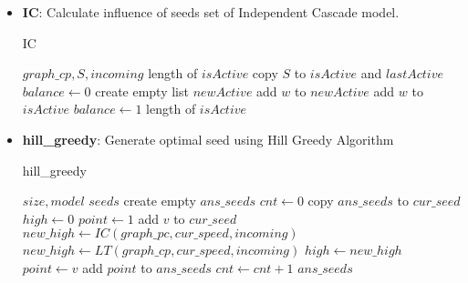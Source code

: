 \documentclass[conference,compsoc]{IEEEtran}
\renewcommand{\algorithmicrequire}{\textbf{Input:}}
\renewcommand{\algorithmicensure}{\textbf{Output:}}
\begin{document}
\begin{itemize}
  \item \textbf{IC}: Calculate influence of seeds set of Independent
	 Cascade model.
    \begin{algorithm}[H]
     \caption{IC}
     \begin{algorithmic}[3]
     \renewcommand{\algorithmicrequire}{\textbf{Input:}}
     \renewcommand{\algorithmicensure}{\textbf{Output:}}
     \REQUIRE $graph\_cp, S, incoming$
     \ENSURE  length of $isActive$
     \STATE copy $S$ to $isActive$ and $lastActive$ 
     \STATE $balance \leftarrow 0$
	\STATE create empty list $newActive$
		    \STATE add $w$ to $newActive$
		    \STATE add $w$ to $isActive$
		\ENDIF
	     \ENDFOR
	     \STATE $balance \leftarrow  1 $
	     \ENDIF
     \ENDWHILE
     \RETURN length of $isActive$
     \end{algorithmic}
     \end{algorithm}
 
 \item \textbf{hill\_greedy}: Generate optimal seed using Hill Greedy Algorithm
     \begin{algorithm}[H]
     \caption{hill\_greedy}
     \begin{algorithmic}[4]
     \renewcommand{\algorithmicrequire}{\textbf{Input:}}
     \renewcommand{\algorithmicensure}{\textbf{Output:}}
     \REQUIRE $size, model$
     \ENSURE  $seeds$
     \STATE create empty $ans\_seeds$
     \STATE $cnt \leftarrow 0$
	\STATE copy $ans\_seeds$ to $cur\_seed$
	\STATE $high \leftarrow 0$
	\STATE $point \leftarrow 1$
	     \STATE add $v$ to $cur\_seed$
	          \STATE $new\_high \leftarrow IC(graph\_pc,cur\_speed, incoming)$ 
	     \ELSE
	          \STATE $new\_high \leftarrow LT(graph\_cp,cur\_speed, incoming)$ 
	     \ENDIF
	         \STATE $high \leftarrow new\_high$
		 \STATE $point \leftarrow v$
	     \ENDIF
        \ENDFOR
	\STATE add $point$ to $ans\_seeds$
	\STATE $cnt \leftarrow cnt+1$
     \ENDWHILE
     \RETURN $ans\_seeds$
     \end{algorithmic}
     \end{algorithm}
 

\end{itemize}
\end{document}
